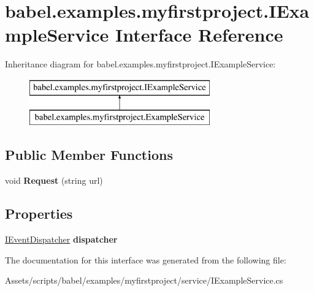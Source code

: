 \hypertarget{interfacebabel_1_1examples_1_1myfirstproject_1_1_i_example_service}{\section{babel.\-examples.\-myfirstproject.\-I\-Example\-Service Interface Reference}
\label{interfacebabel_1_1examples_1_1myfirstproject_1_1_i_example_service}
}
Inheritance diagram for babel.\-examples.\-myfirstproject.\-I\-Example\-Service\-:\begin{figure}[H]
\begin{center}
\leavevmode
\includegraphics[height=2.000000cm]{interfacebabel_1_1examples_1_1myfirstproject_1_1_i_example_service}
\end{center}
\end{figure}
\subsection*{Public Member Functions}
\begin{DoxyCompactItemize}
\item 
\hypertarget{interfacebabel_1_1examples_1_1myfirstproject_1_1_i_example_service_a0380c5f6a20bcbf018a1fd43381ee077}{void {\bfseries Request} (string url)}\label{interfacebabel_1_1examples_1_1myfirstproject_1_1_i_example_service_a0380c5f6a20bcbf018a1fd43381ee077}

\end{DoxyCompactItemize}
\subsection*{Properties}
\begin{DoxyCompactItemize}
\item 
\hypertarget{interfacebabel_1_1examples_1_1myfirstproject_1_1_i_example_service_ac69f89838133faecbd25046a50a4a465}{\hyperlink{interfacebabel_1_1extensions_1_1dispatcher_1_1eventdispatcher_1_1api_1_1_i_event_dispatcher}{I\-Event\-Dispatcher} {\bfseries dispatcher}}\label{interfacebabel_1_1examples_1_1myfirstproject_1_1_i_example_service_ac69f89838133faecbd25046a50a4a465}

\end{DoxyCompactItemize}


The documentation for this interface was generated from the following file\-:\begin{DoxyCompactItemize}
\item 
Assets/scripts/babel/examples/myfirstproject/service/I\-Example\-Service.\-cs\end{DoxyCompactItemize}
